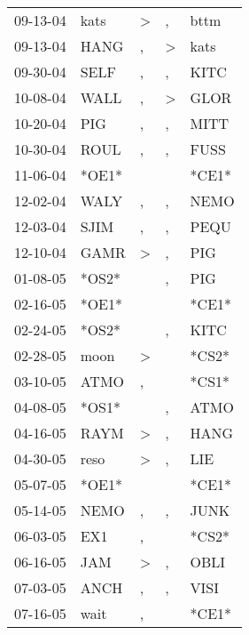 \begin{supertabular}{lllll}
 09-13-04 &   kats &     \textgreater &                , &   bttm \\
 09-13-04 &   HANG &                , &     \textgreater &   kats \\
 09-30-04 &   SELF &                , &                , &   KITC \\
 10-08-04 &   WALL &                , &     \textgreater &   GLOR \\
 10-20-04 &    PIG &                , &                , &   MITT \\
 10-30-04 &   ROUL &                , &                , &   FUSS \\
 11-06-04 &  *OE1* &                  &                  &  *CE1* \\
 12-02-04 &   WALY &                , &                , &   NEMO \\
 12-03-04 &   SJIM &                , &                , &   PEQU \\
 12-10-04 &   GAMR &     \textgreater &                , &    PIG \\
 01-08-05 &  *OS2* &                  &                , &    PIG \\
 02-16-05 &  *OE1* &                  &                  &  *CE1* \\
 02-24-05 &  *OS2* &                  &                , &   KITC \\
 02-28-05 &   moon &     \textgreater &                  &  *CS2* \\
 03-10-05 &   ATMO &                , &                  &  *CS1* \\
 04-08-05 &  *OS1* &                  &                , &   ATMO \\
 04-16-05 &   RAYM &     \textgreater &                , &   HANG \\
 04-30-05 &   reso &     \textgreater &                , &    LIE \\
 05-07-05 &  *OE1* &                  &                  &  *CE1* \\
 05-14-05 &   NEMO &                , &                , &   JUNK \\
 06-03-05 &    EX1 &                , &                  &  *CS2* \\
 06-16-05 &    JAM &     \textgreater &                , &   OBLI \\
 07-03-05 &   ANCH &                , &                , &   VISI \\
 07-16-05 &   wait &                , &                  &  *CE1* \\

\end{supertabular}
